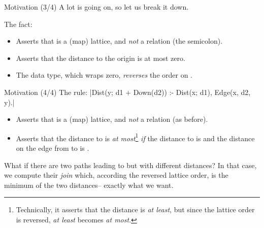 \begin{frame}[fragile]{Motivation (3/4)}
A lot is going on, so let us break it down.

\medskip

The fact: 

\begin{itemize}
    \item Asserts that  is a (map) lattice, and \emph{not} a relation (the semicolon).
    \item Asserts that the distance to the origin is at most zero. 
    \item The  data type, which wraps zero, \emph{reverses} the order
    on .
\end{itemize}
\end{frame}

\begin{frame}[fragile]{Motivation (4/4)}
The rule: \Code|Dist(y; d1 + Down(d2)) :- Dist(x; d1), Edge(x, d2, y).|
%
\begin{itemize}
    \item Asserts that  is a (map) lattice, and \emph{not} a relation (as before).
    \item Asserts that the distance to  is \emph{at
    most}\footnote{Technically, it asserts that the distance is \emph{at least},
    but since the lattice order is reversed, \emph{at least} becomes \emph{at
    most}.}  \emph{if} the distance to  is 
    and the distance on the edge from  to  is .
\end{itemize}

What if there are two paths leading to  but with different distances?
In that case, we compute their \emph{join} which, according the reversed lattice
order, is the minimum of the two distances-- exactly what we want.
\end{frame}

